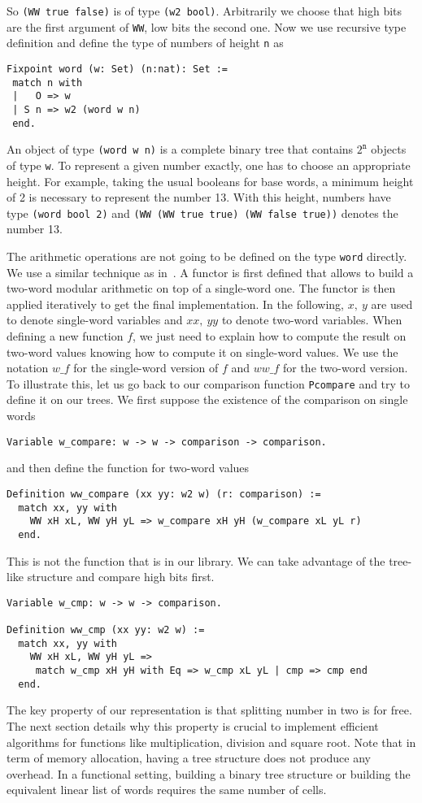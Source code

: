 So {\tt (WW true false)} is of type {\tt (w2 bool)}.
Arbitrarily we choose that high bits are the first argument of {\tt WW}, low bits
the second one. Now we use recursive type definition and define
the type of numbers of height {\tt n} as
\begin{verbatim}
Fixpoint word (w: Set) (n:nat): Set :=
 match n with
 |   O => w
 | S n => w2 (word w n)
 end.
\end{verbatim}
An object of type {\tt (word w n)} is a complete binary tree that
contains $2^\texttt{n}$ objects of type {\tt w}.
To represent a given number exactly, one has to choose an appropriate height.
For example, taking the usual booleans for base words, a minimum
height of 2 is necessary to represent the number 13. With this height, 
numbers have type {\tt (word bool 2)} and 
{\tt (WW (WW true true) (WW false true))} denotes the number 13.

The arithmetic operations are not going to be defined on the type {\tt word} directly.
We use a similar technique as in~\cite{GreMa}. A functor is first defined that 
allows to build a two-word modular arithmetic on top of a single-word one.
The functor is then applied iteratively to get the final implementation.
In the following, $x,\ y$ are used to denote single-word variables and $xx,\ yy$ 
to denote two-word variables. 
When defining a new function $f$, we just need to explain how to compute the 
result on two-word values knowing how to compute it on single-word values.
We use the notation $w\_f$ for the single-word version of $f$ and 
$ww\_f$ for the two-word version.
To illustrate this, let us go back to our comparison function {\tt Pcompare}
and try to define it on our trees. We first suppose the existence
of the comparison on single words
\begin{verbatim}
Variable w_compare: w -> w -> comparison -> comparison.
\end{verbatim}
and then define the function for two-word values
\begin{verbatim}
Definition ww_compare (xx yy: w2 w) (r: comparison) :=
  match xx, yy with
    WW xH xL, WW yH yL => w_compare xH yH (w_compare xL yL r) 
  end.
\end{verbatim}
This is not the function that is in our library. We can take 
advantage of the tree-like structure and compare high bits first.  
\begin{verbatim}
Variable w_cmp: w -> w -> comparison.

Definition ww_cmp (xx yy: w2 w) :=
  match xx, yy with
    WW xH xL, WW yH yL => 
     match w_cmp xH yH with Eq => w_cmp xL yL | cmp => cmp end
  end. 
\end{verbatim}
The key property of our representation is that splitting number in two
is for free. The next section details why this property is crucial to implement efficient
algorithms for functions like multiplication, division and square root.
Note that in term of memory allocation, having a tree structure
does not produce any overhead. In a functional setting, building a binary 
tree structure or building the equivalent linear list of words requires the same number of cells.

